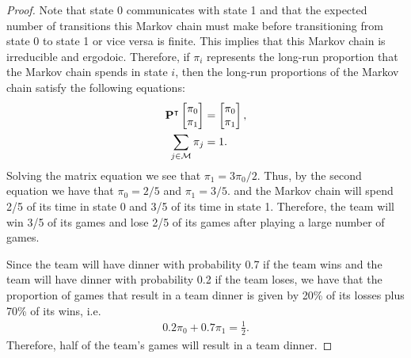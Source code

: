 \begin{proof}
  Note that state 0 communicates with state 1 and that the expected number of transitions
  this Markov chain must make before transitioning from state 0 to state 1 or vice versa is finite.
  This implies that this Markov chain is irreducible and ergodoic. Therefore, if $\pi_i$ represents
  the long-run proportion that the Markov chain spends in state $i$, then the
  long-run proportions of the Markov chain satisfy the following equations:
  \begin{align*}
     \bold{P}^\intercal \begin{bmatrix} \pi_0 \\ \pi_1 \\ \end{bmatrix} &= \begin{bmatrix} \pi_0 \\ \pi_1 \\ \end{bmatrix},\\
     \sum_{j\in \mathcal{M}} \pi_j &= 1.
  \end{align*}
  Solving the matrix equation we see that $\pi_1 = 3\pi_0/2$. Thus, by the second equation we have that $\pi_0 = 2/5$ and $\pi_1 = 3/5$.
  and the Markov chain will spend 2/5 of its time in state 0 and 3/5 of its time in state 1. Therefore,
  the team will win 3/5 of its games and lose 2/5 of its games after playing a large number of games.

  Since the team will have dinner with probability 0.7 if the team wins and the team will have
  dinner with probability 0.2 if the team loses, we have that the proportion of games
  that result in a team dinner is given by 20\% of its losses plus 70\% of its wins, i.e.\
  \begin{align*}
    0.2 \pi_0 + 0.7 \pi_1 = \frac{1}{2}.
  \end{align*}
  Therefore, half of the team's games will result in a team dinner.
\end{proof}
\newpage
